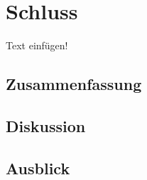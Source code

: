 \chapter{Schluss}
\label{ch:Schluss}
Text einfügen!

\section{Zusammenfassung}

\section{Diskussion}

\section{Ausblick}